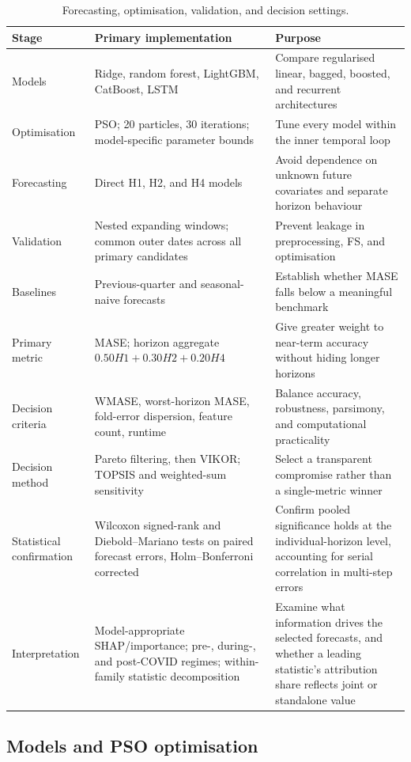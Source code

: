 \documentclass[preprint,12pt]{elsarticle}
\begin{document}
\begin{table}[H]
\centering
\caption{Forecasting, optimisation, validation, and decision settings.}
\label{tab:experimental_setup}
\begin{tabularx}{\textwidth}{@{}p{2.4cm}p{4.0cm}Y@{}}
\toprule
Stage & Primary implementation & Purpose \\
\midrule
Models & Ridge, random forest, LightGBM, CatBoost, LSTM & Compare regularised linear, bagged, boosted, and recurrent architectures \\
Optimisation & PSO; 20 particles, 30 iterations; model-specific parameter bounds & Tune every model within the inner temporal loop \\
Forecasting & Direct H1, H2, and H4 models & Avoid dependence on unknown future covariates and separate horizon behaviour \\
Validation & Nested expanding windows; common outer dates across all primary candidates & Prevent leakage in preprocessing, FS, and optimisation \\
Baselines & Previous-quarter and seasonal-naive forecasts & Establish whether MASE falls below a meaningful benchmark \\
Primary metric & MASE; horizon aggregate $0.50H1+0.30H2+0.20H4$ & Give greater weight to near-term accuracy without hiding longer horizons \\
Decision criteria & WMASE, worst-horizon MASE, fold-error dispersion, feature count, runtime & Balance accuracy, robustness, parsimony, and computational practicality \\
Decision method & Pareto filtering, then VIKOR; TOPSIS and weighted-sum sensitivity & Select a transparent compromise rather than a single-metric winner \\
Statistical confirmation & Wilcoxon signed-rank and Diebold--Mariano tests on paired forecast errors, Holm--Bonferroni corrected & Confirm pooled significance holds at the individual-horizon level, accounting for serial correlation in multi-step errors \\
Interpretation & Model-appropriate SHAP/importance; pre-, during-, and post-COVID regimes; within-family statistic decomposition & Examine what information drives the selected forecasts, and whether a leading statistic's attribution share reflects joint or standalone value \\
\bottomrule
\end{tabularx}
\end{table}

\subsection{Models and PSO optimisation}
\end{document}
